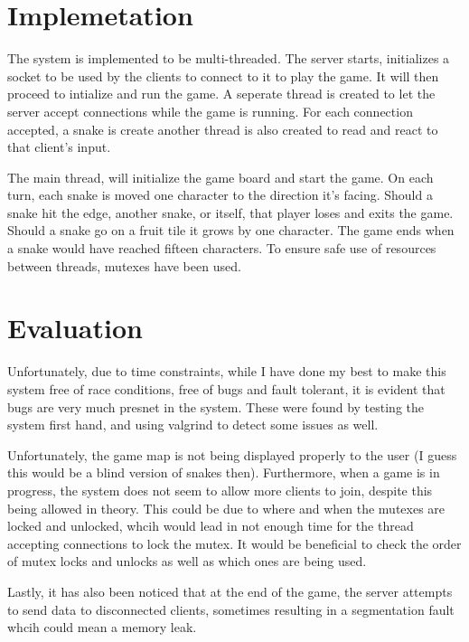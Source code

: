 \documentclass[programming,a4paper,12pt,twosided]{myassignment}
\begin{document}
\chapter{Implemetation}
The system is implemented to be multi-threaded. The server starts, initializes a socket to be used by the clients to connect to it to play the game. It will then proceed to intialize and run the game. A seperate thread is created to let the server accept connections while the game is running. For each connection accepted, a snake is create another thread is also created to read and react to that client's input.

The main thread, will initialize the game board and start the game. On each turn, each snake is moved one character to the direction it's facing. Should a snake hit the edge, another snake, or itself, that player loses and exits the game. Should a snake go on a fruit tile it grows by one character. The game ends when a snake would have reached fifteen characters. To ensure safe use of resources between threads, mutexes have been used.

\chapter{Evaluation}
Unfortunately, due to time constraints, while I have done my best to make this system free of race conditions, free of bugs and fault tolerant, it is evident that bugs are very much presnet in the system. These were found by testing the system first hand, and using valgrind to detect some issues as well.

Unfortunately, the game map is not being displayed properly to the user (I guess this would be a blind version of snakes then). Furthermore, when a game is in progress,  the system does not seem to allow more clients to join, despite this being allowed in theory. This could be due to where and when the mutexes are locked and unlocked, whcih would lead in not enough time for the thread accepting connections to lock the mutex. It would be beneficial to check the order of mutex locks and unlocks as well as which ones are being used.

Lastly, it has also been noticed that at the end of the game, the server attempts to send data to disconnected clients, sometimes resulting in a segmentation fault whcih could mean a memory leak.
\end{document}

